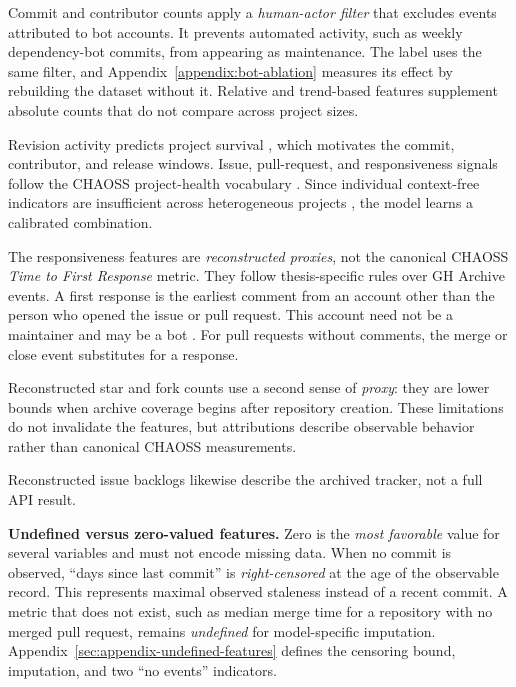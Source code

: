 Commit and contributor counts apply a \emph{human-actor filter} that excludes
events attributed to bot accounts. It prevents automated activity, such as
weekly dependency-bot commits, from appearing as maintenance. The label uses the
same filter, and
Appendix~\ref{appendix:bot-ablation} measures its effect by rebuilding the
dataset without it. Relative and trend-based features supplement absolute counts
that do not compare across project sizes.

Revision activity predicts project survival \cite{robinson2022survival}, which
motivates the commit, contributor, and release windows. Issue, pull-request, and
responsiveness signals follow the CHAOSS project-health vocabulary
\cite{chaossStarterProjectHealth,goggins2021transparent}. Since individual
context-free indicators are insufficient across heterogeneous projects
\cite{yehudi2023contextfree}, the model learns a calibrated combination.

The responsiveness features are \emph{reconstructed proxies}, not the canonical
CHAOSS \emph{Time to First Response} metric. They follow thesis-specific rules
over GH Archive events. A first response is the earliest comment from an account
other than the person who opened the issue or pull request. This account need not
be a maintainer and may be a bot
\cite{hasan2023firstresponse}. For pull requests without comments, the merge or
close event substitutes for a response.

Reconstructed star and fork counts use a second sense of \emph{proxy}: they are
lower bounds when
archive coverage begins after repository creation. These limitations do not
invalidate the features, but attributions describe observable behavior rather
than canonical CHAOSS measurements.

Reconstructed issue backlogs likewise describe the archived tracker, not a full
API result.

\label{sec:method-undefined-features}
\textbf{Undefined versus zero-valued features.} Zero is the \emph{most favorable} value
for several variables and must not encode missing data. When no commit is
observed, ``days since last commit'' is \emph{right-censored} at the age of the
observable record. This represents maximal observed staleness instead of a
recent commit. A metric that does not exist, such as median merge time for a
repository with no merged pull request, remains \emph{undefined} for model-specific
imputation. Appendix~\ref{sec:appendix-undefined-features} defines the censoring
bound, imputation, and two ``no events'' indicators.

